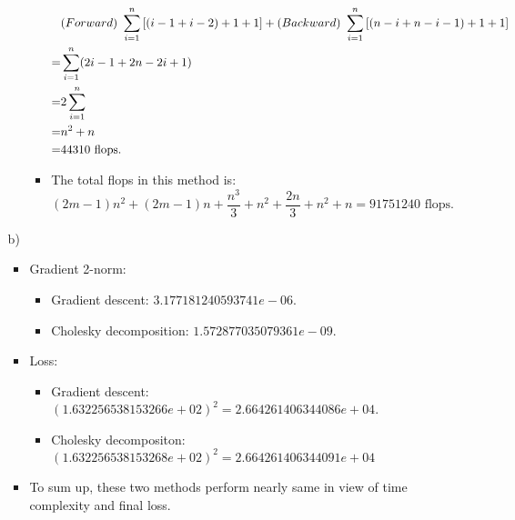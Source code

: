 \documentclass[english,onecolumn]{IEEEtran}
\begin{document}
\begin{enumerate}
\begin{itemize}
\begin{itemize}
\begin{itemize}
\begin{align*}
							&\text(Forward)\,\,\sum_{i=1}^n \left[(i-1+i-2)+1+1\right] +\text(Backward)\,\,\sum_{i=1}^n\left[ (n-i+n-i-1)+1+1\right]\\
							=&\sum_{i=1}^n(2i-1+2n-2i+1)\\
							=&2\sum_{i=1}^{n}\\
							=&n^2+n\\
							=&44310 \,\,\text{flops}.
						\end{align*}
					\item The total flops in this method is: $$(2m-1)n^2 +(2m-1)n +\frac{n^3}{3} + n^2+\frac{2n}{3}+n^2+n = 91751240\,\,\text{flops}.$$
				\end{itemize}
		\end{itemize}
	\item [b)] 
		\begin{itemize}
			\item Gradient 2-norm:
				\begin{itemize}
					\item Gradient descent: $3.177181240593741e-06$.
					\item Cholesky decomposition: $1.572877035079361e-09$.
				\end{itemize}
			\item Loss:
				\begin{itemize}
					\item Gradient descent: $(1.632256538153266e+02)^2 = 2.664261406344086e+04$.
					\item Cholesky decompositon: $(1.632256538153268e+02)^2 = 2.664261406344091e+04$
				\end{itemize}
			\item To sum up, these two methods perform nearly same in view of time complexity and final loss.
		\end{itemize}
	\end{itemize}
\end{enumerate}

\newpage
\end{document}
